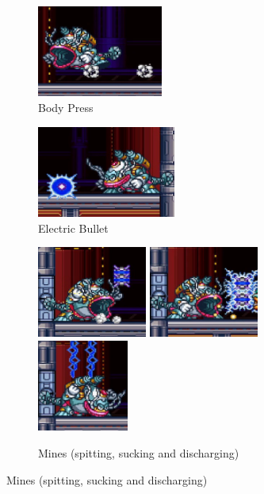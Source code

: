 \begin{figure}[htp]
	\centering
	\begin{subfigure}{.4\linewidth}
		\centering
		\includegraphics[height=3cm]{figures/X3/Volt_catfish/catfish_flop.jpg}
		\caption{Body Press}
	\end{subfigure}
	\begin{subfigure}{.4\linewidth}
		\centering
		\includegraphics[height=3cm]{figures/X3/Volt_catfish/catfish_bullet.jpg}
		\caption{Electric Bullet}
	\end{subfigure}
		\begin{subfigure}{\linewidth}
		\centering
		\includegraphics[height=3cm]{figures/X3/Volt_catfish/catfish_mine_1.jpg}
		\includegraphics[height=3cm]{figures/X3/Volt_catfish/catfish_mine_2.jpg}
		\includegraphics[height=3cm]{figures/X3/Volt_catfish/catfish_mine_3.jpg}
		\caption{Mines (spitting, sucking and discharging)}
	\end{subfigure}
	

\end{figure}
